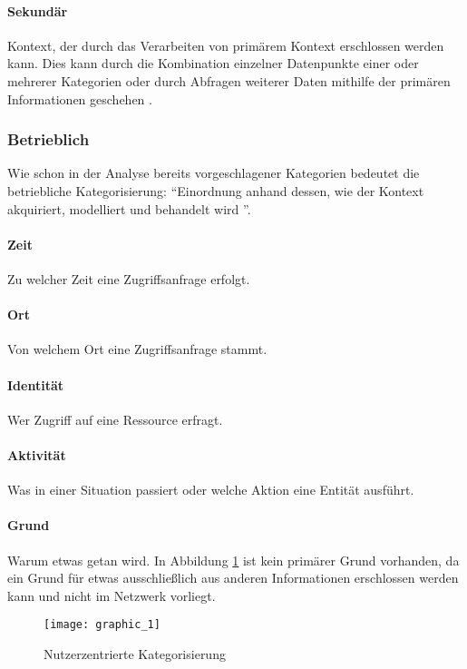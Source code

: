 \paragraph{Sekundär}
Kontext, der durch das Verarbeiten von primärem Kontext erschlossen werden kann. Dies kann durch die Kombination einzelner Datenpunkte einer oder mehrerer Kategorien oder durch Abfragen weiterer Daten mithilfe der primären Informationen geschehen \cite{abowd_towards_1999}.
\subsubsection{Betrieblich}
Wie schon in der Analyse bereits vorgeschlagener Kategorien bedeutet die betriebliche Kategorisierung: ``Einordnung anhand dessen, wie der Kontext akquiriert, modelliert und behandelt wird ''\cite{van2005context}.
\paragraph{Zeit}
Zu welcher Zeit eine Zugriffsanfrage erfolgt.
\paragraph{Ort}
Von welchem Ort eine Zugriffsanfrage stammt.
\paragraph{Identität}
Wer Zugriff auf eine Ressource erfragt.
\paragraph{Aktivität}
Was in einer Situation passiert oder welche Aktion eine Entität ausführt.
\paragraph{Grund}
Warum etwas getan wird. In  Abbildung \ref{Tax_1}  ist kein primärer Grund vorhanden, da ein Grund für etwas ausschließlich aus anderen Informationen erschlossen werden kann und nicht im Netzwerk vorliegt.
\begin{figure}[H]
\label{Tax_1}
\centering
\texttt{[image: graphic\_1]}
\caption{Nutzerzentrierte Kategorisierung}
\end{figure}
